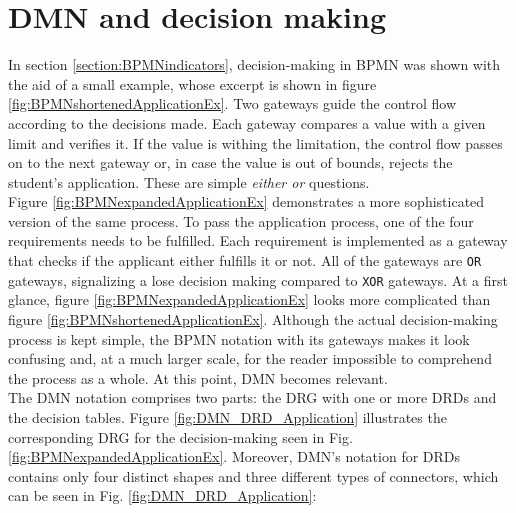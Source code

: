 \section{DMN and decision making}
In section \ref{section:BPMNindicators}, decision-making in BPMN was shown with the aid of a small example, whose excerpt is shown in figure \ref{fig:BPMNshortenedApplicationEx}. Two gateways guide the control flow according to the decisions made. Each gateway compares a value with a given limit and verifies it. If the value is withing the limitation, the control flow passes on to the next gateway or, in case the value is out of bounds, rejects the student's application. These are simple \textit{either or} questions. \\
Figure \ref{fig:BPMNexpandedApplicationEx} demonstrates a more sophisticated version of the same process. To pass the application process,  one of the four requirements needs to be fulfilled. Each requirement is implemented as a gateway that checks if the applicant either fulfills it or not. All of the gateways are \texttt{OR} gateways, signalizing a lose decision making compared to \texttt{XOR} gateways. At a first glance, figure \ref{fig:BPMNexpandedApplicationEx} looks more complicated than figure \ref{fig:BPMNshortenedApplicationEx}. Although the actual decision-making process is kept simple, the BPMN notation with its gateways makes it look confusing and, at a much larger scale, for the reader impossible to comprehend the process as a whole. At this point, DMN becomes relevant. \\

The DMN notation comprises two parts: the \acl{DRG} with one or more \aclp{DRD} and the decision tables. Figure \ref{fig:DMN_DRD_Application} illustrates the corresponding \ac{DRG} for the decision-making seen in Fig. \ref{fig:BPMNexpandedApplicationEx}. Moreover, DMN's notation for DRDs contains only four distinct shapes and three different types of connectors, which can be seen in Fig. \ref{fig:DMN_DRD_Application}: 


